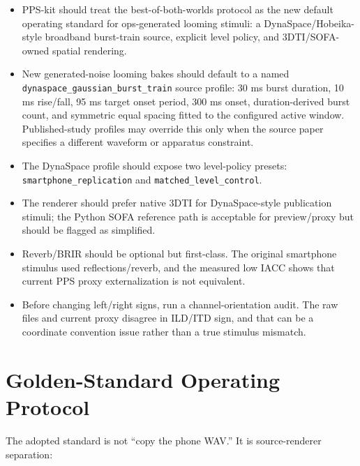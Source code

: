 \documentclass[10pt]{article}
\begin{document}
\begin{itemize}
  \item PPS-kit should treat the best-of-both-worlds protocol as the new default operating standard for ops-generated looming stimuli: a DynaSpace/Hobeika-style broadband burst-train source, explicit level policy, and 3DTI/SOFA-owned spatial rendering.
  \item New generated-noise looming bakes should default to a named \texttt{dynaspace\_gaussian\_burst\_train} source profile: 30 ms burst duration, 10 ms rise/fall, 95 ms target onset period, 300 ms onset, duration-derived burst count, and symmetric equal spacing fitted to the configured active window. Published-study profiles may override this only when the source paper specifies a different waveform or apparatus constraint.
  \item The DynaSpace profile should expose two level-policy presets: \texttt{smartphone\_replication} and \texttt{matched\_level\_control}.
  \item The renderer should prefer native 3DTI for DynaSpace-style publication stimuli; the Python SOFA reference path is acceptable for preview/proxy but should be flagged as simplified.
  \item Reverb/BRIR should be optional but first-class. The original smartphone stimulus used reflections/reverb, and the measured low IACC shows that current PPS proxy externalization is not equivalent.
  \item Before changing left/right signs, run a channel-orientation audit. The raw files and current proxy disagree in ILD/ITD sign, and that can be a coordinate convention issue rather than a true stimulus mismatch.
\end{itemize}

\section*{Golden-Standard Operating Protocol}

The adopted standard is not ``copy the phone WAV.'' It is source-renderer separation:
\end{document}
